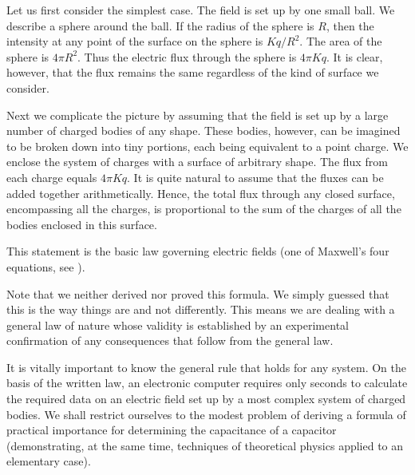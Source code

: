 Let us first consider the simplest case. The field is set up by one small ball. We describe a sphere around the ball. If the radius of the sphere is $R$, then the intensity at any point of the surface on the sphere is $Kq/R^{2}$. The area of the sphere is $4\pi R^{2}$. Thus the electric flux through the sphere is $4 \pi Kq$. It is clear, however, that the flux remains the same regardless of the kind of surface we consider.

Next we complicate the picture by assuming that the field is set up by a large number of charged bodies of any shape. These bodies, however, can be imagined to be broken down into tiny portions, each being equivalent to a point charge. We enclose the system of charges with a surface of arbitrary shape. The flux from each charge equals $4 \pi Kq$. It is quite natural to assume that the fluxes can be added together arithmetically. Hence, the total flux through any closed surface, encompassing all the charges, is proportional to the sum of the charges of all the bodies enclosed in this surface.

This statement is the basic law governing electric fields (one of Maxwell's four equations, see ). 

Note that we neither derived nor proved this formula. We simply guessed that this is the way things are and not differently. This means we are dealing with a general law of nature whose validity is established by an experimental confirmation of any consequences that follow from the general law.

It is vitally important to know the general rule that holds for any system. On the basis of the written law, an electronic computer requires only seconds to calculate the required data on an electric field set up by a most complex system of charged bodies. We shall restrict ourselves to the modest problem of deriving a formula of practical importance for determining the capacitance of a capacitor (demonstrating, at the same time, techniques of theoretical physics applied to an elementary case).

